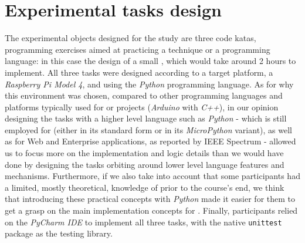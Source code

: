 \section{Experimental tasks design}
The experimental objects designed for the study are three code katas, \ie programming exercises aimed at practicing a technique or a programming language: in this case the design of a small \es, which would take around 2 hours to implement. 
All three tasks were designed according to a target platform, a \textit{Raspberry Pi Model 4}, and using the \textit{Python} programming language. As for why this environment was chosen, compared to other programming languages and platforms typically used for \ess or \iot projects (\eg \textit{Arduino} with \textit{C++}), in our opinion designing the tasks with a higher level language such as \textit{Python} - which is still employed for \ess (either in its standard form or in its \textit{MicroPython} variant), as well as for Web and Enterprise applications, as reported by IEEE Spectrum \cite{IEEESpectrum} - allowed us to focus more on the implementation and logic details than we would have done by designing the tasks orbiting around lower level language features and mechanisms.
Furthermore, if we also take into account that some participants had a limited, mostly theoretical, knowledge of \ess prior to the course's end, we think that introducing these practical concepts with \textit{Python} made it easier for them to get a grasp on the main implementation concepts for \ess. Finally, participants relied on the \textit{PyCharm IDE} to implement all three tasks, with the native \texttt{unittest} package as the testing library.

